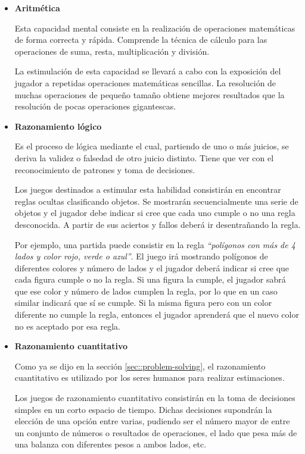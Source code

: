 \begin{itemize}
\item {\bf Aritmética}

Esta capacidad mental consiste en la realización de operaciones matemáticas de forma correcta y rápida. Comprende la técnica de cálculo para las operaciones de suma, resta, multiplicación y división.

La estimulación de esta capacidad se llevará a cabo con la exposición del jugador a repetidas operaciones matemáticas sencillas. La resolución de muchas operaciones de pequeño tamaño obtiene mejores resultados que la resolución de pocas operaciones gigantescas.

\item {\bf Razonamiento lógico}

Es el proceso de lógica mediante el cual, partiendo de uno o más juicios, se deriva la validez o falsedad de otro juicio distinto. Tiene que ver con el reconocimiento de patrones y toma de decisiones.

Los juegos destinados a estimular esta habilidad consistirán en encontrar reglas ocultas clasificando objetos. Se mostrarán secuencialmente una serie de objetos y el jugador debe indicar si cree que cada uno cumple o no una regla desconocida. A partir de sus aciertos y fallos deberá ir desentrañando la regla.

Por ejemplo, una partida puede consistir en la regla {\it ``polígonos con más de 4 lados y color rojo, verde o azul''}. El juego irá mostrando polígonos de diferentes colores y número de lados y el jugador deberá indicar si cree que cada figura cumple o no la regla. Si una figura la cumple, el jugador sabrá que ese color y número de lados cumplen la regla, por lo que en un caso similar indicará que sí se cumple. Si la misma figura pero con un color diferente no cumple la regla, entonces el jugador aprenderá que el nuevo color no es aceptado por esa regla.

\item {\bf Razonamiento cuantitativo}

Como ya se dijo en la sección \ref{sec::problem-solving}, el razonamiento cuantitativo es utilizado por los seres humanos para realizar estimaciones.

Los juegos de razonamiento cuantitativo consistirán en la toma de decisiones simples en un corto espacio de tiempo. Dichas decisiones supondrán la elección de una opción entre varias, pudiendo ser el número mayor de entre un conjunto de números o resultados de operaciones, el lado que pesa más de una balanza con diferentes pesos a ambos lados, etc.


\end{itemize}
